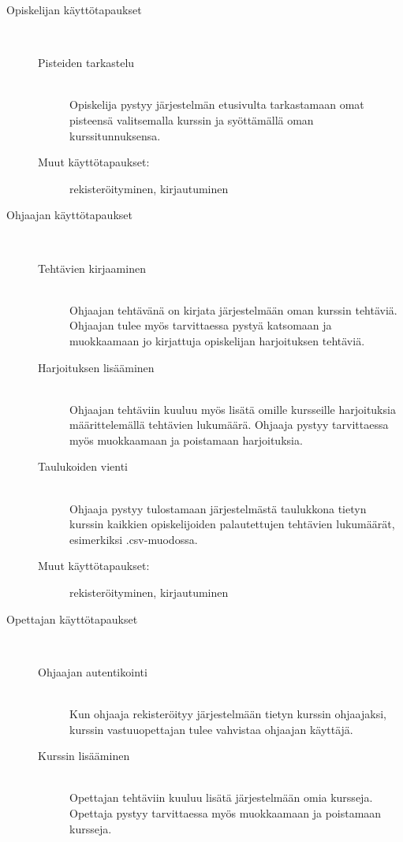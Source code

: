 \documentclass[a4paper,12pt, titlepage]{article}
\begin{document}
\begin{description}
	\item[Opiskelijan käyttötapaukset] \hfill \\
	\begin{description}
		\item[Pisteiden tarkastelu] \hfill \\
		Opiskelija pystyy järjestelmän etusivulta tarkastamaan
		omat pisteensä valitsemalla kurssin ja syöttämällä
		oman kurssitunnuksensa.
		\item[Muut käyttötapaukset:] rekisteröityminen, kirjautuminen
	\end{description}
	\item[Ohjaajan käyttötapaukset] \hfill \\
	\begin{description}
		\item[Tehtävien kirjaaminen] \hfill \\
		Ohjaajan tehtävänä on kirjata järjestelmään oman kurssin tehtäviä.
		Ohjaajan tulee myös tarvittaessa pystyä katsomaan ja muokkaamaan
		jo kirjattuja opiskelijan harjoituksen tehtäviä.
		\item[Harjoituksen lisääminen] \hfill \\
		Ohjaajan tehtäviin kuuluu myös lisätä omille kursseille harjoituksia
		määrittelemällä tehtävien lukumäärä. Ohjaaja pystyy tarvittaessa
		myös muokkaamaan ja poistamaan harjoituksia.
		\item[Taulukoiden vienti] \hfill \\
		Ohjaaja pystyy tulostamaan järjestelmästä taulukkona tietyn kurssin
		kaikkien opiskelijoiden palautettujen tehtävien lukumäärät, esimerkiksi
		.csv-muodossa.
		\item[Muut käyttötapaukset:] rekisteröityminen, kirjautuminen
	\end{description}
	\item[Opettajan käyttötapaukset] \hfill \\
	\begin{description}
		\item[Ohjaajan autentikointi] \hfill \\
		Kun ohjaaja rekisteröityy järjestelmään tietyn kurssin ohjaajaksi,
		kurssin vastuuopettajan tulee vahvistaa ohjaajan käyttäjä.
		\item[Kurssin lisääminen] \hfill \\
		Opettajan tehtäviin kuuluu lisätä järjestelmään omia kursseja.
		Opettaja pystyy tarvittaessa myös muokkaamaan ja poistamaan kursseja.

\end{description}
\end{description}
\end{document}
